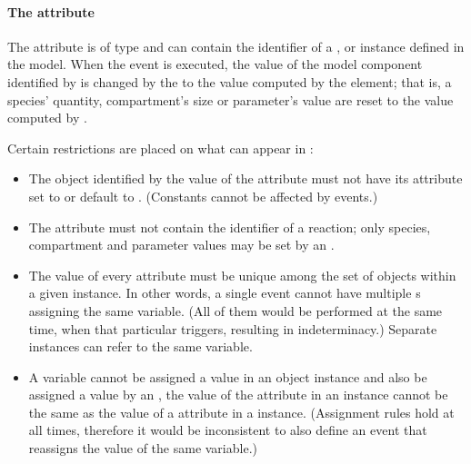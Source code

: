 \paragraph{The  attribute}

The  attribute is of type  and can
contain the identifier of a \Compartment, \Species or \Parameter
instance defined in the model.  When the event is executed, the value of
the model component identified by  is changed by
the \EventAssignment to the value computed by the 
element; that is, a species' quantity, compartment's size or
parameter's value are reset to the value computed by .

Certain restrictions are placed on what can appear in
:
\begin{itemize}
  
\item The object identified by the value of the 
  attribute must not have its  attribute set to or default
  to .  (Constants cannot be affected by events.)
  
\item The  attribute must not contain the identifier
  of a reaction; only species, compartment and parameter values
  may be set by an \Event.
  
\item The value of every  attribute must be unique
  among the set of \EventAssignment objects within a given
  \Event instance.  In other words, a single event cannot have
  multiple \EventAssignment{}s assigning the same variable.  (All
  of them would be performed at the same time, when that
  particular \Event triggers, resulting in indeterminacy.)
  Separate \Event instances can refer to the same variable.
  
\item A variable cannot be assigned a value in an \EventAssignment
  object instance and also be assigned a value by an
  \AssignmentRule, \ie the value of the  attribute
  in an \EventAssignment instance cannot be the same as the value
  of a  attribute in a \AssignmentRule instance.
  (Assignment rules hold at all times, therefore it would be
  inconsistent to also define an event that reassigns the value of
  the same variable.)

\end{itemize}

